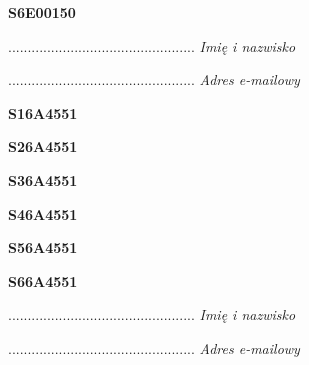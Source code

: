 \begin{turn}{90}\huge \textbf{S6E00150}\end{turn}

\begin{turn}{90}\begin{minipage}{\linewidth} \vspace{20mm} ................................................  \textit{Imię i nazwisko}\end{minipage}\end{turn}

\begin{turn}{90}\begin{minipage}{\linewidth} \vspace{20mm} ................................................  \textit{Adres e-mailowy}\end{minipage}\end{turn}

\begin{turn}{90}\huge \textbf{S16A4551}\end{turn}

\begin{turn}{90}\huge \textbf{S26A4551}\end{turn}

\begin{turn}{90}\huge \textbf{S36A4551}\end{turn}

\begin{turn}{90}\huge \textbf{S46A4551}\end{turn}

\begin{turn}{90}\huge \textbf{S56A4551}\end{turn}

\begin{turn}{90}\huge \textbf{S66A4551}\end{turn}

\begin{turn}{90}\begin{minipage}{\linewidth} \vspace{20mm} ................................................  \textit{Imię i nazwisko}\end{minipage}\end{turn}

\begin{turn}{90}\begin{minipage}{\linewidth} \vspace{20mm} ................................................  \textit{Adres e-mailowy}\end{minipage}\end{turn}

